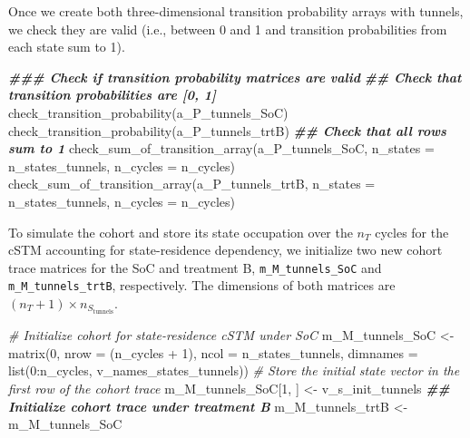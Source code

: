 \documentclass[
]{article}
\newenvironment{Shaded}{\begin{snugshade}}{\end{snugshade}}
\newcommand{\AttributeTok}[1]{\textcolor[rgb]{0.77,0.63,0.00}{#1}}
\newcommand{\CommentTok}[1]{\textcolor[rgb]{0.56,0.35,0.01}{\textit{#1}}}
\newcommand{\DecValTok}[1]{\textcolor[rgb]{0.00,0.00,0.81}{#1}}
\newcommand{\DocumentationTok}[1]{\textcolor[rgb]{0.56,0.35,0.01}{\textbf{\textit{#1}}}}
\newcommand{\FunctionTok}[1]{\textcolor[rgb]{0.00,0.00,0.00}{#1}}
\newcommand{\NormalTok}[1]{#1}
\newcommand{\OtherTok}[1]{\textcolor[rgb]{0.56,0.35,0.01}{#1}}
\newcommand{\SpecialCharTok}[1]{\textcolor[rgb]{0.00,0.00,0.00}{#1}}
\begin{document}
Once we create both three-dimensional transition probability arrays with tunnels, we check they are valid (i.e., between 0 and 1 and transition probabilities from each state sum to 1).

\begin{Shaded}
\begin{Highlighting}[]
\DocumentationTok{\#\#\# Check if transition probability matrices are valid}
\DocumentationTok{\#\# Check that transition probabilities are [0, 1]}
\FunctionTok{check\_transition\_probability}\NormalTok{(a\_P\_tunnels\_SoC)}
\FunctionTok{check\_transition\_probability}\NormalTok{(a\_P\_tunnels\_trtB)}
\DocumentationTok{\#\# Check that all rows sum to 1}
\FunctionTok{check\_sum\_of\_transition\_array}\NormalTok{(a\_P\_tunnels\_SoC, }\AttributeTok{n\_states =}\NormalTok{ n\_states\_tunnels, }
                              \AttributeTok{n\_cycles =}\NormalTok{ n\_cycles)}
\FunctionTok{check\_sum\_of\_transition\_array}\NormalTok{(a\_P\_tunnels\_trtB, }\AttributeTok{n\_states =}\NormalTok{ n\_states\_tunnels, }
                              \AttributeTok{n\_cycles =}\NormalTok{ n\_cycles)}
\end{Highlighting}
\end{Shaded}

To simulate the cohort and store its state occupation over the \(n_T\) cycles for the cSTM accounting for state-residence dependency, we initialize two new cohort trace matrices for the SoC and treatment B, \texttt{m\_M\_tunnels\_SoC} and \texttt{m\_M\_tunnels\_trtB}, respectively. The dimensions of both matrices are \((n_T+1) \times n_{S_{\text{tunnels}}}\).

\begin{Shaded}
\begin{Highlighting}[]
\CommentTok{\# Initialize cohort for state{-}residence cSTM under SoC}
\NormalTok{m\_M\_tunnels\_SoC }\OtherTok{\textless{}{-}} \FunctionTok{matrix}\NormalTok{(}\DecValTok{0}\NormalTok{, }
                      \AttributeTok{nrow =}\NormalTok{ (n\_cycles }\SpecialCharTok{+} \DecValTok{1}\NormalTok{), }\AttributeTok{ncol =}\NormalTok{ n\_states\_tunnels, }
                      \AttributeTok{dimnames =} \FunctionTok{list}\NormalTok{(}\DecValTok{0}\SpecialCharTok{:}\NormalTok{n\_cycles, v\_names\_states\_tunnels))}
\CommentTok{\# Store the initial state vector in the first row of the cohort trace}
\NormalTok{m\_M\_tunnels\_SoC[}\DecValTok{1}\NormalTok{, ] }\OtherTok{\textless{}{-}}\NormalTok{ v\_s\_init\_tunnels}
\DocumentationTok{\#\# Initialize cohort trace under treatment B}
\NormalTok{m\_M\_tunnels\_trtB }\OtherTok{\textless{}{-}}\NormalTok{ m\_M\_tunnels\_SoC}
\end{Highlighting}
\end{Shaded}
\end{document}

